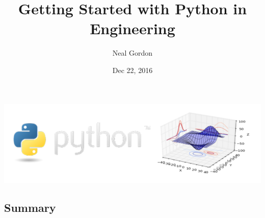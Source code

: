 \documentclass[%
oneside,                 %
final,                   %
10pt]{article}
\begin{document}






\title{Getting Started with Python in Engineering}


\author{Neal Gordon}


\date{Dec 22, 2016}
\maketitle

\centerline{\includegraphics[width=0.9\linewidth]{fig/pythonengineering.png}}



\subsection{Summary}
\end{document}
